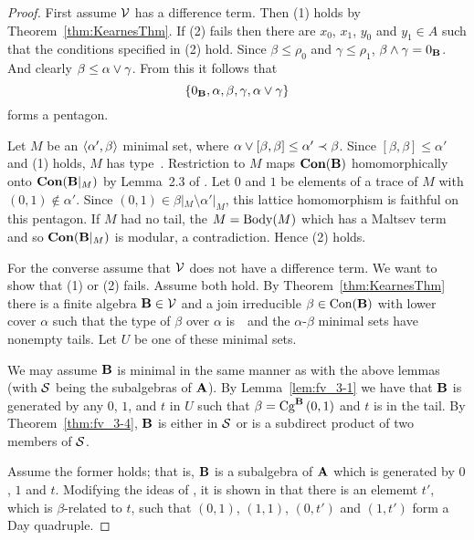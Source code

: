 \begin{proof}
First assume $\sV$ has a difference term.
Then (1) holds by Theorem~\ref{thm:KearnesThm}.
If (2) fails then there are $x_0$, $x_1$, $y_0$ and $y_1 \in A$ such
that the conditions specified in (2) hold. 
Since $\beta \le \rho_0$ and 
$\gamma \le \rho_1$, $\beta \meet \gamma = 0_{\alg B}$. And clearly
$\beta \le \alpha \join \gamma$.
From this it follows that 
\[
\{0_{\alg B}, \alpha, \beta, \gamma, \alpha \join \gamma\}
\]
forms a pentagon.

Let $M$ be an $\la \alpha',\beta\ra$ minimal set, 
where $\alpha \join [\beta,\beta] \le \alpha' \cov \beta$. 
Since $[\beta,\beta] \le \alpha'$
and (1) holds, $M$ has type~\atyp.
Restriction to $M$ maps  $\Con (\alg B)$ homomorphically 
onto $\Con (\alg B|_M)$ by Lemma~2.3 of \cite{HM:1988}. 
Let $0$ and $1$ be elements of a trace of $M$ with 
$(0,1) \notin \alpha'$. 
Since $(0,1) \in \beta|_M\setminus \alpha'|_M$, this 
lattice homomorphism is faithful on this pentagon. If 
$M$ had no tail, the $M = \body(M)$ which has a Maltsev
term and so $\Con(\alg B|_M)$ is modular, a contradiction.
Hence (2) holds.


For the converse assume that $\sV$ does not have a difference 
term. 
We want to show that (1) or (2) fails. Assume both hold.
By Theorem~\ref{thm:KearnesThm} there is a finite 
algebra $\alg B \in \sV$ and a join irreducible 
$\beta \in \op{Con}(\alg B)$ with lower cover 
$\alpha$ such that the type of $\beta$ over $\alpha$ is~\atyp\
and the $\alpha$-$\beta$ minimal sets have
nonempty tails. Let $U$ be one of these minimal sets.


We may assume $\alg B$ is minimal in the same manner as with the
above lemmas (with $\sS$ being the subalgebras of $\alg A$).
By Lemma~\ref{lem:fv_3-1} 
we have that $\alg B$ is generated by any $0$, $1$, and $t$ in
$U$ such
that $\beta = \Cga 01{B}$ and $t$ is in the tail. By 
Theorem~\ref{thm:fv_3-4}, $\alg B$ is either 
in $\sS$ or is a subdirect product of two members of $\sS$.

Assume the former holds; that is, $\alg B$ is a subalgebra
of $\alg A$ which is generated by $0$, $1$ and $t$. Modifying 
the ideas of \cite{KearnesKiss1999}, it is shown in
\cite{Freese:2009} that there is an elememt $t'$, which
is $\beta$-related to $t$, such that
$(0,1)$, $(1,1)$, $(0,t')$ and $(1,t')$ form a Day
quadruple.




\medskip




\end{proof}
